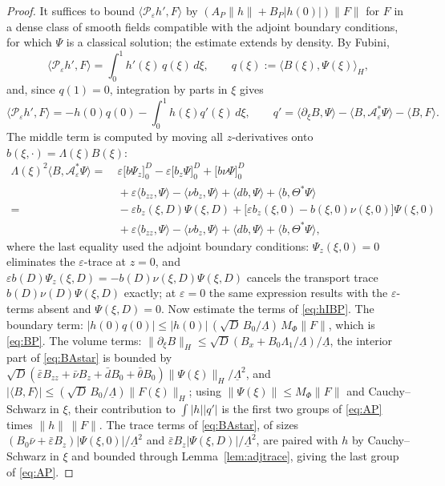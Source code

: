 \documentclass[12pt]{article}
\theoremstyle{plain}
\theoremstyle{remark}
\newcommand{\uL}{\underline\Lambda}
\newcommand{\PP}{\mathcal P}
\newcommand{\Hs}{H}
\begin{document}
\begin{proof}
It suffices to bound $\langle\PP_\varepsilon h',F\rangle$ by $(A_P\|h\|+B_P|h(0)|)\|F\|$ for $F$ in a dense class of smooth fields compatible with the adjoint boundary conditions, for which $\Psi$ is a classical solution; the estimate extends by density. By Fubini,
\begin{equation}
 \langle\PP_\varepsilon h',F\rangle
 =\int_0^1h'(\xi)\,q(\xi)\,d\xi,
 \qquad
 q(\xi):=\langle B(\xi),\Psi(\xi)\rangle_\Hs,
 \label{eq:hdef}
\end{equation}
and, since $q(1)=0$, integration by parts in $\xi$ gives
\begin{equation}
 \langle\PP_\varepsilon h',F\rangle
 =-h(0)q(0)-\int_0^1h(\xi)q'(\xi)\,d\xi,
 \qquad
 q'=\langle\partial_\xi B,\Psi\rangle-\langle B,\mathcal A_\varepsilon^*\Psi\rangle-\langle B,F\rangle .
 \label{eq:hIBP}
\end{equation}
The middle term is computed by moving all $z$-derivatives onto $b(\xi,\cdot)=\Lambda(\xi)B(\xi)$:
\begin{align}
 \Lambda(\xi)^2\langle B,\mathcal A_\varepsilon^*\Psi\rangle
 =&\ \varepsilon\big[b\Psi_z\big]_0^D-\varepsilon\big[b_z\Psi\big]_0^D
 +\big[b\nu\Psi\big]_0^D
 \nonumber\\
 &\ +\varepsilon\langle b_{zz},\Psi\rangle
 -\langle\nu b_z,\Psi\rangle
 +\langle db,\Psi\rangle+\langle b,\Theta^*\Psi\rangle
 \nonumber\\
 =&\ -\varepsilon b_z(\xi,D)\Psi(\xi,D)
 +\big[\varepsilon b_z(\xi,0)-b(\xi,0)\nu(\xi,0)\big]\Psi(\xi,0)
 \nonumber\\
 &\ +\varepsilon\langle b_{zz},\Psi\rangle-\langle\nu b_z,\Psi\rangle
 +\langle db,\Psi\rangle+\langle b,\Theta^*\Psi\rangle,
 \label{eq:BAstar}
\end{align}
where the last equality used the adjoint boundary conditions: $\Psi_z(\xi,0)=0$ eliminates the $\varepsilon$-trace at $z=0$, and $\varepsilon b(D)\Psi_z(\xi,D)=-b(D)\nu(\xi,D)\Psi(\xi,D)$ cancels the transport trace $b(D)\nu(D)\Psi(\xi,D)$ exactly; at $\varepsilon=0$ the same expression results with the $\varepsilon$-terms absent and $\Psi(\xi,D)=0$. Now estimate the terms of \eqref{eq:hIBP}. The boundary term: $|h(0)q(0)|\le|h(0)|\,(\sqrt D\,B_0/\uL)\,M_\Phi\|F\|$, which is \eqref{eq:BP}. The volume terms: $\|\partial_\xi B\|_\Hs\le\sqrt D(B_x+B_0\Lambda_1/\uL)/\uL$, the interior part of \eqref{eq:BAstar} is bounded by $\sqrt D(\bar\varepsilon B_{zz}+\bar\nu B_z+\bar dB_0+\bar\theta B_0)\|\Psi(\xi)\|_\Hs/\uL^2$, and $|\langle B,F\rangle|\le(\sqrt D\,B_0/\uL)\|F(\xi)\|_\Hs$; using $\|\Psi(\xi)\|\le M_\Phi\|F\|$ and Cauchy--Schwarz in $\xi$, their contribution to $\int|h||q'|$ is the first two groups of \eqref{eq:AP} times $\|h\|\,\|F\|$. The trace terms of \eqref{eq:BAstar}, of sizes $(B_0\bar\nu+\bar\varepsilon B_z)|\Psi(\xi,0)|/\uL^2$ and $\bar\varepsilon B_z|\Psi(\xi,D)|/\uL^2$, are paired with $h$ by Cauchy--Schwarz in $\xi$ and bounded through Lemma~\ref{lem:adjtrace}, giving the last group of \eqref{eq:AP}.
\end{proof}
\end{document}
